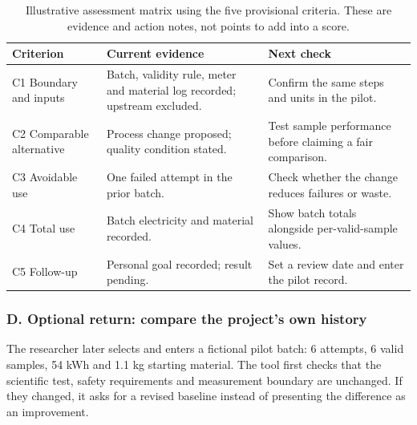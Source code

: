 \documentclass[11pt,a4paper]{article}
\begin{document}
\begin{table}[H]
\centering\small
\begin{tabularx}{\textwidth}{@{}>{\raggedright\arraybackslash}p{}>{\raggedright\arraybackslash}p{}X@{}}
\toprule
Criterion & Current evidence & Next check \\
\midrule
C1 Boundary and inputs & Batch, validity rule, meter and material log recorded; upstream excluded. & Confirm the same steps and units in the pilot. \\
C2 Comparable alternative & Process change proposed; quality condition stated. & Test sample performance before claiming a fair comparison. \\
C3 Avoidable use & One failed attempt in the prior batch. & Check whether the change reduces failures or waste. \\
C4 Total use & Batch electricity and material recorded. & Show batch totals alongside per-valid-sample values. \\
C5 Follow-up & Personal goal recorded; result pending. & Set a review date and enter the pilot record. \\
\bottomrule
\end{tabularx}
\caption{Illustrative assessment matrix using the five provisional criteria. These are evidence and action notes, not points to add into a score.}
\label{tab:assess-criteria-screen}
\end{table}

\subsubsection*{D. Optional return: compare the project's own history}
The researcher later selects  and enters a fictional pilot batch: 6 attempts, 6 valid samples, 54 kWh and 1.1 kg starting material. The tool first checks that the scientific test, safety requirements and measurement boundary are unchanged. If they changed, it asks for a revised baseline instead of presenting the difference as an improvement.
\end{document}
